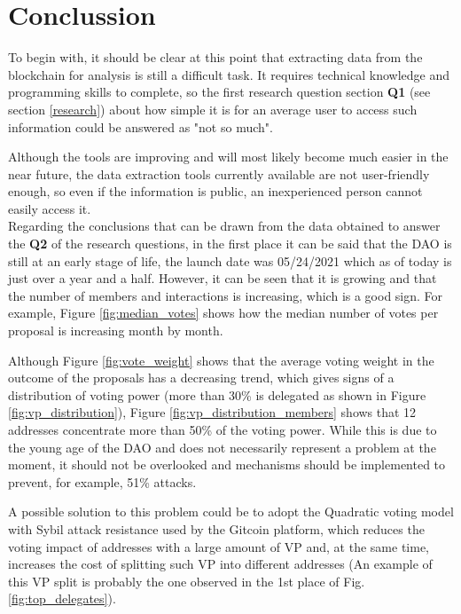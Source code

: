 \documentclass[MSE,Master,english]{twbook}%
\begin{document}
\chapter{Conclussion\label{conclussion}}

To begin with, it should be clear at this point that extracting data from the blockchain for analysis is still a difficult task. It requires technical knowledge and programming skills to complete, so the first research question section \textbf{Q1} (see section \ref{research}) about how simple it is for an average user to access such information could be answered as "not so much".

Although the tools are improving and will most likely become much easier in the near future, the data extraction tools currently available are not user-friendly enough, so even if the information is public, an inexperienced person cannot easily access it. \\

Regarding the conclusions that can be drawn from the data obtained to answer the \textbf{Q2} of the research questions, in the first place it can be said that the \gls{DAO} is still at an early stage of life, the launch date was 05/24/2021 which as of today is just over a year and a half. However, it can be seen that it is growing and that the number of members and interactions is increasing, which is a good sign. For example, Figure \ref{fig:median_votes} shows how the median number of votes per proposal is increasing month by month.

Although Figure \ref{fig:vote_weight} shows that the average voting weight in the outcome of the proposals has a decreasing trend, which gives signs of a distribution of voting power (more than 30\% is delegated as shown in Figure \ref{fig:vp_distribution}), Figure \ref{fig:vp_distribution_members} shows that 12 addresses concentrate more than 50\% of the voting power. While this is due to the young age of the \gls{DAO} and does not necessarily represent a problem at the moment, it should not be overlooked and mechanisms should be implemented to prevent, for example, 51\% attacks\cite{51PercentAttack}. 

A possible solution to this problem could be to adopt the Quadratic voting model with Sybil attack resistance used by the Gitcoin platform\cite{gitcoin}, which reduces the voting impact of addresses with a large amount of VP and, at the same time, increases the cost of splitting such VP into different addresses (An example of this VP split is probably the one observed in the 1st place of Fig. \ref{fig:top_delegates}). \\
\end{document}
